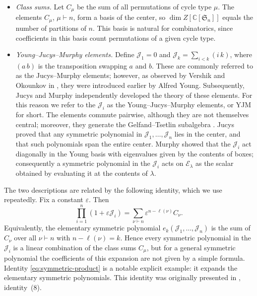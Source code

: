 \documentclass{article}
\theoremstyle{plain}
\theoremstyle{definition}
\numberwithin{equation}{section}
\begin{document}
\begin{itemize}
    \item \emph{Class sums.} Let $C_\mu$ be the sum of all permutations of cycle type $\mu$. The elements $C_\mu$, $\mu\vdash n$, form a basis of the center, so $\dim Z[\mathbb C[\mathfrak S_n]]$ equals the number of partitions of $n$. This basis is natural for combinatorics, since coefficients in this basis count permutations of a given cycle type.
    \item \emph{Young--Jucys--Murphy elements.} Define $\mathcal J_1=0$ and $\mathcal J_k=\sum_{i<k}(i\,k)$, where $(a\,b)$ is the transposition swapping $a$ and $b$. These are commonly referred to as the Jucys--Murphy elements; however, as observed by Vershik and Okounkov in \cite{vershik2005newapproachrepresentationthoery}, they were introduced earlier by Alfred Young. Subsequently, Jucys \cite{jucys1974symmetric} and Murphy \cite{Murphy1983} independently developed the theory of these elements. For this reason we refer to the $\mathcal J_i$ as the Young--Jucys--Murphy elements, or YJM for short. The elements commute pairwise, although they are not themselves central; moreover, they generate the Gelfand--Tsetlin subalgebra \cite{vershik2005newapproachrepresentationthoery}. Jucys \cite{jucys1974symmetric} proved that any symmetric polynomial in $\mathcal J_1,\dots,\mathcal J_n$ lies in the center, and that such polynomials span the entire center. Murphy \cite{murphy1981new} showed that the $\mathcal J_i$ act diagonally in the Young basis with eigenvalues given by the contents of boxes; consequently a symmetric polynomial in the $\mathcal J_i$ acts on $\mathcal E_\lambda$ as the scalar obtained by evaluating it at the contents of $\lambda$. 
\end{itemize}

The two descriptions are related by the following identity, which we use repeatedly.
Fix a constant $\varepsilon$. Then
\begin{equation}
    \label{eq:symmetric-product}
    \prod_{i=1}^n (1+ \varepsilon \mathcal{J}_i) = \sum_{\nu \vdash n} \varepsilon^{n-\ell(\nu)} C_\nu.
\end{equation}
Equivalently, the elementary symmetric polynomial $e_k(\mathcal J_1,\dots,\mathcal J_n)$ is the sum of $C_\nu$
over all $\nu\vdash n$ with $n-\ell(\nu)=k$. Hence every symmetric polynomial in the $\mathcal J_i$ is a linear combination of the class sums $C_\mu$, but for a general symmetric polynomial the coefficients of this expansion are not given by a simple formula. Identity \eqref{eq:symmetric-product} is a notable explicit example: it expands the elementary symmetric polynomials. This identity was originally presented in \cite{jucys1974symmetric}, identity~(8).
\end{document}
